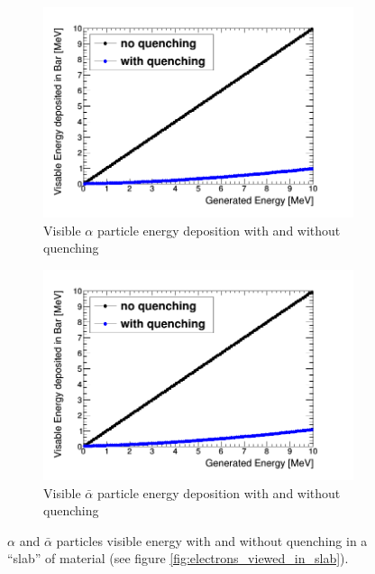 \begin{figure}[htbp]
\centering
\begin{subfigure}{.5\textwidth}
  \centering
  \includegraphics[width=\linewidth]{quench_eng_Alpha.png}
  \captionsetup{width=.9\linewidth}
  \caption{Visible $\alpha$ particle energy deposition with and without quenching}
  \label{subFig:alpha_quenched_and_not}
\end{subfigure}%
\begin{subfigure}{.5\textwidth}
  \centering
  \includegraphics[width=\linewidth]{quench_eng_AAlpha.png}
  \captionsetup{width=.9\linewidth}
  \caption{Visible $\bar{\alpha}$ particle energy deposition with and without quenching}
  \label{subFig:Aalpha_quenched_and_not}
\end{subfigure}
\caption{$\alpha$ and $\bar{\alpha}$ particles visible energy with and without quenching in a ``slab'' of material (see figure \ref{fig:electrons_viewed_in_slab}).}
\label{fig:alpha_Aalpha_quenched_and_not}
\end{figure}

